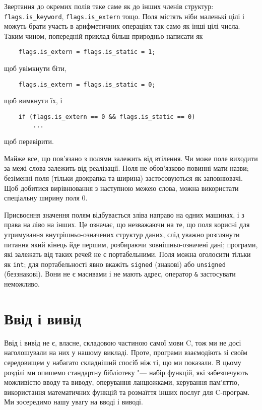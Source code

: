 \documentclass[a4paper,12pt]{book}
\begin{document}
  Звертання до окремих полів таке саме як до інших членів структур:
  \texttt{flags.is\_keyword}, \texttt{flags.is\_extern} тощо. Поля містять ніби маленькі
  цілі і можуть брати участь в арифметичних операціях так само як інші цілі числа. Таким
  чином, попередній приклад більш природньо написати як
  \begin{verbatim}
    flags.is_extern = flags.is_static = 1;
  \end{verbatim}
  щоб увімкнути біти,
  \begin{verbatim}
    flags.is_extern = flags.is_static = 0;
  \end{verbatim}
  щоб вимкнути їх, і
  \begin{verbatim}
    if (flags.is_extern == 0 && flags.is_static == 0)
        ...
  \end{verbatim}
  щоб перевірити.

  Майже все, що пов'язано з полями залежить від втілення. Чи може поле виходити за
  межі слова залежить від реалізації. Поля не обов'язково повинні мати назви;
  безіменні поля (тільки двокрапка та ширина) застосовуються як заповнювачі. Щоб добитися
  вирівнювання з наступною межею слова, можна використати спеціальну ширину поля 0.

  Присвоєння значення полям відбувається зліва направо на одних машинах, і з права на ліво
  на інших. Це означає, що незважаючи на те, що поля корисні для утримування
  внутрішньо-означених структур даних, слід уважно розглянути питання який кінець йде
  першим, розбираючи зовнішньо-означені дані; програми, які залежать від таких речей не є
  портабельними. Поля можна оголосити тільки як \texttt{int}; для портабельності явно
  вкажіть \texttt{signed} (знакові) або \texttt{unsigned} (беззнакові). Вони не є
  масивами і не мають адрес, оператор \texttt{\&} застосувати неможливо.

\chapter{Ввід і вивід}

\label{f0:ch7}
  Ввід і вивід не є, власне, складовою частиною самої мови C, тож ми не досі
  наголошували на них у нашому викладі. Проте, програми взаємодіють зі своїм середовищем
  у набагато складніший спосіб ніж ті, що ми показали. В цьому розділі ми опишемо
  стандартну бібліотеку "--- набір функцій, які забезпечують можливістю вводу та виводу,
  оперування ланцюжками, керування пам'яттю, використання математичних функцій та
  розмаїття інших послуг для C-програм. Ми зосередимо нашу увагу на вводі і виводі.
\end{document}
